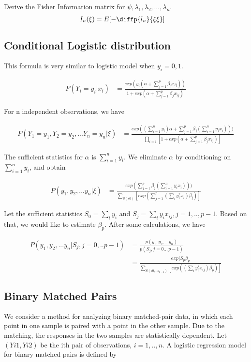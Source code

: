 \documentclass[11pt]{article} %
\begin{document}
	Derive the Fisher Information matrix for $\psi, \lambda_1, \lambda_2, ..., \lambda_n$.
	\begin{align*}
	I_n(\xi) &= E[-\diffp{l_n}{\xi \xi}]
	\end{align*}	
	
	
	
	\subsection{Conditional Logistic distribution}
	This formula is very similar to logistic model when $y_i = 0,1$.
	
	\begin{align*}
	P(Y_i= y_i|x_i) &= \frac{exp(y_i(\alpha + \sum_{j=1}^p \beta_j x_{ij}))}{1 + exp(\alpha + \sum_{j=1}^p \beta_j x_{ij})}
	\end{align*}
	
	For n independent observations, we have
	
	\begin{align*}
	P(Y_1= y_1, Y_2=y_2,... Y_n= y_n|\xi) &= \frac{exp( (\sum_{i=1}^n y_i) \alpha + \sum_{j=1}^p \beta_j (\sum_{i=1}^n y_i x_i) ))}{ \prod_{i=1} [1 + exp(\alpha + \sum_{j=1}^p \beta_j x_{ij})]}
	\end{align*}			
	
	The sufficient statistics for $\alpha$ is $\sum_{i=1}^n y_i$. We eliminate $\alpha$ by conditioning on $\sum_{i=1}^n y_i$, and obtain 
	
	\begin{align*}
	P(y_1, y_2,... y_n|\xi) &= \frac{exp( \sum_{j=1}^p \beta_j (\sum_{i=1}^n y_i x_i) ))}{\sum_{S(s0)}[ exp( \sum_{j=1}^p (\sum_{i} y_i^{\ast} x_i) \beta_j )]}
	\end{align*}

Let the sufficient statistics $S_0 = \sum_i y_i$ and $S_j = \sum_i y_i x_{ij}, j = 1,.., p-1$. Based on that, we would like to estimate $\beta_p$.
After some calculations, we have

	\begin{align*}
	P(y_1, y_2,... y_n|S_j, j=0,..p-1) &= \frac{p(y_1, y_2,... y_n)}{p(S_j, j=0.., p-1)} \\
	&= \frac{exp( S_p \beta_p  }{\sum_{S(s0,.. s_{p-1})}[ exp( (\sum_{i} y_i^{\ast} x_{ij}) \beta_p )]}
	\end{align*}

	\subsection{Binary Matched Pairs}
	We consider a method for analyzing binary matched-pair data, in which each point in one sample is paired with a point in the other sample. Due to the matching, the responses in the two samples are statistically dependent. Let	$(Yi1, Yi2)$ be the ith pair of observations, $i = 1, .., n$. A logistic regression
	model for binary matched pairs is defined by
	
\end{document}

